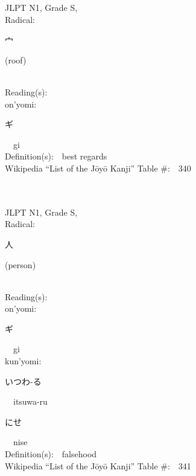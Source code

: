 \begin{multicols}{2}
{JLPT N1, Grade S, \\Radical:\ \ {\begin{CJK}{UTF8}{min} 宀 \end{CJK}} (roof) } \\
Reading(s):\ \ \\
{\hspace*{1em}}on'yomi:\ \ \\
{\hspace*{2em}}{\begin{CJK}{UTF8}{min} ギ \end{CJK}}\ \ gi\ \ \\
Definition(s):\ \ best regards \\
Wikipedia ``List of the J\=oy\=o Kanji'' Table \#:\ \ 340 \\
\ \ \\
{\fontsize{34pt}{40pt}  }\ \ \\
{JLPT N1, Grade S, \\Radical:\ \ {\begin{CJK}{UTF8}{min} 人 \end{CJK}} (person) } \\
Reading(s):\ \ \\
{\hspace*{1em}}on'yomi:\ \ \\
{\hspace*{2em}}{\begin{CJK}{UTF8}{min} ギ \end{CJK}}\ \ gi\ \ \\
{\hspace*{1em}}kun'yomi:\ \ \\
{\hspace*{2em}}{\begin{CJK}{UTF8}{min} いつわ-る \end{CJK}}\ \ itsuwa-ru\ \ \\
{\hspace*{2em}}{\begin{CJK}{UTF8}{min} にせ \end{CJK}}\ \ nise\ \ \\
Definition(s):\ \ falsehood \\
Wikipedia ``List of the J\=oy\=o Kanji'' Table \#:\ \ 341 \\
\ \ \\
{\fontsize{34pt}{40pt}  }\ \ \\

\end{multicols}

